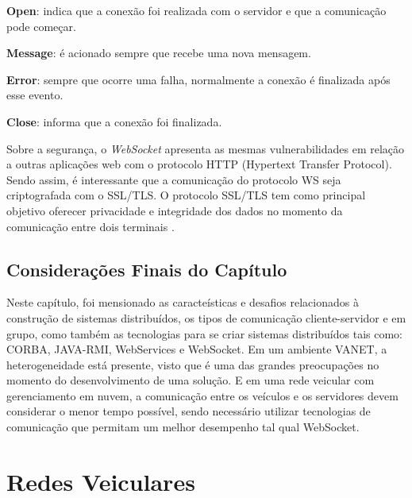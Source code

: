\documentclass[
	12pt,				%
	oneside,			%
	a4paper,			%
	english,			%
	brazil				%
	]{abntex2ppgsi}
\begin{document}
\begin{itemize*}
	\item{\textbf{Open}: indica que a conexão foi realizada com o servidor e que a comunicação pode começar.}
	\item{\textbf{Message}: é acionado sempre que recebe uma nova mensagem.}
	\item{\textbf{Error}: sempre que ocorre uma falha, normalmente a conexão é finalizada após esse evento.}
	\item{\textbf{Close}: informa que a conexão foi finalizada.}
\end{itemize*}

Sobre a segurança, o \textit{WebSocket} apresenta as mesmas vulnerabilidades em relação a outras aplicações web com o protocolo HTTP (Hypertext Transfer Protocol). Sendo assim, é interessante que a comunicação do protocolo WS seja criptografada com o SSL/TLS.  O protocolo SSL/TLS tem como principal objetivo oferecer privacidade e integridade dos dados no momento da comunicação entre dois terminais \cite{themudo2014implementaccao}. %


\section{Considerações Finais do Capítulo}
 
Neste capítulo, foi mensionado as caracteísticas e desafios relacionados à construção de sistemas distribuídos, os tipos de comunicação cliente-servidor e em grupo, como também as tecnologias para se criar sistemas distribuídos tais como: CORBA, JAVA-RMI, WebServices e WebSocket. Em um ambiente VANET, a heterogeneidade está presente, visto que é uma das grandes preocupações no momento do desenvolvimento de uma solução. E em uma rede veicular com gerenciamento em nuvem, a comunicação entre os veículos e os servidores devem considerar o menor tempo possível, sendo necessário utilizar tecnologias de comunicação que permitam um melhor desempenho tal qual WebSocket.

\chapter{Redes Veiculares}
\end{document}

